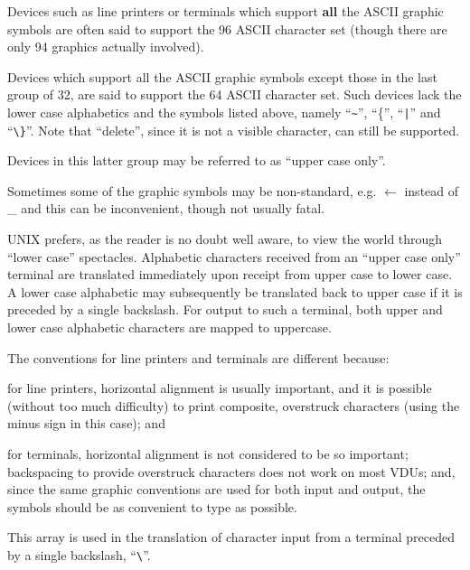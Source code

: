 
Devices such as line printers or terminals which support {\bf all} the ASCII
graphic symbols are often said to support the 96 ASCII character set (though
there are only 94 graphics actually
involved).

Devices which support all the ASCII
graphic symbols except those in the
last group of 32, are said to support
the 64 ASCII character set. Such devices lack the lower case alphabetics
and the symbols listed above, namely ``\verb+~+'', ``\{'', ``\verb+|+'' and
``\verb+\}+''. Note that
``delete'', since it is not a visible
character, can still be supported.

Devices in this latter group may be
referred to as ``upper case only''.

Sometimes some of the graphic symbols
may be non-standard, e.g. $\leftarrow$  instead
of \_ and this can be inconvenient,
though not usually fatal.

UNIX prefers, as the reader is no doubt
well aware, to view the world through
``lower case'' spectacles. Alphabetic
characters received from an ``upper case
only'' terminal are translated
immediately upon receipt from upper
case to lower case. A lower case alphabetic may subsequently be translated
back to upper case if it is preceded by
a single backslash. For output to such
a terminal, both upper and lower case
alphabetic characters are mapped to uppercase.


The conventions for line printers and
terminals are different because:

\bd
\item[(a)] for line printers, horizontal
alignment is usually important,
and it is possible (without too
much difficulty) to print composite, overstruck characters
(using the minus sign in this
case); and

\item[(b)] for terminals, horizontal alignment is not considered to be so
important; backspacing to provide overstruck characters does
not work on most VDUs; and,
since the same graphic conventions are used for both input
and output, the symbols should
be as convenient to type as possible.
\ed


This array is used in the translation
of character input from a terminal preceded by a single backslash, ``\verb+\+''.

